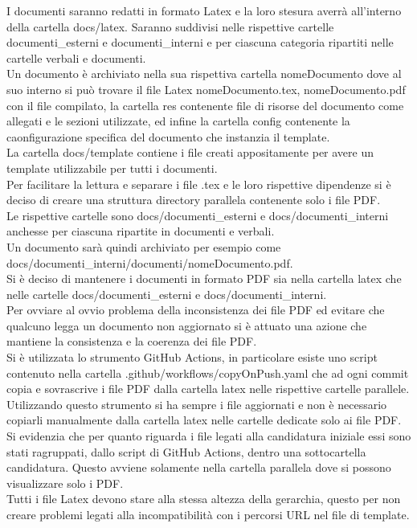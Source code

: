 I documenti saranno redatti in formato Latex e la loro stesura averrà all'interno della cartella docs/latex.
Saranno suddivisi nelle rispettive cartelle documenti\_esterni e documenti\_interni e per ciascuna categoria ripartiti
nelle cartelle verbali e documenti.\\
Un documento è archiviato nella sua rispettiva cartella nomeDocumento dove al suo interno si può trovare il file Latex
nomeDocumento.tex, nomeDocumento.pdf con il file compilato, la cartella res contenente file di risorse del documento come allegati
e le sezioni utilizzate, ed infine la cartella config contenente la caonfigurazione specifica del documento che instanzia il template.\\
La cartella docs/template contiene i file creati appositamente per avere un template utilizzabile per tutti i documenti.\\
Per facilitare la lettura e separare i file .tex e le loro rispettive dipendenze si è deciso di creare una struttura directory
parallela contenente solo i file PDF.\\
Le rispettive cartelle sono docs/documenti\_esterni e docs/documenti\_interni anchesse per ciascuna ripartite in documenti e verbali.\\
Un documento sarà quindi archiviato per esempio come docs/documenti\_interni/documenti/nomeDocumento.pdf.\\
Si è deciso di mantenere i documenti in formato PDF sia nella cartella latex che nelle cartelle docs/documenti\_esterni e docs/documenti\_interni.\\
Per ovviare al ovvio problema della inconsistenza dei file PDF ed evitare che qualcuno legga un documento non aggiornato si è attuato una azione che 
mantiene la consistenza e la coerenza dei file PDF.\\
Si è utilizzata lo strumento GitHub Actions, in particolare esiste uno script contenuto nella cartella .github/workflows/copyOnPush.yaml che ad ogni commit copia e sovrascrive
i file PDF dalla cartella latex nelle rispettive cartelle parallele.\\
Utilizzando questo strumento si ha sempre i file aggiornati e non è necessario copiarli manualmente dalla cartella latex nelle cartelle dedicate solo
ai file PDF.\\
Si evidenzia che per quanto riguarda i file legati alla candidatura iniziale essi sono stati ragruppati, dallo script di GitHub Actions, dentro
una sottocartella candidatura.
Questo avviene solamente nella cartella parallela dove si possono visualizzare solo i PDF.\\
Tutti i file Latex devono stare alla stessa altezza della gerarchia, questo per non creare problemi legati alla incompatibilità 
con i percorsi URL nel file di template.


